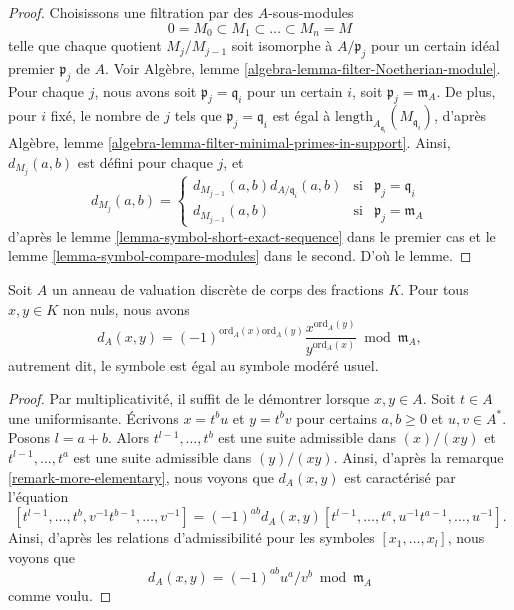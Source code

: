 \begin{proof}
Choisissons une filtration par des $A$-sous-modules
$$
0 = M_0 \subset M_1 \subset \ldots \subset M_n = M
$$
telle que chaque quotient $M_j/M_{j - 1}$ soit isomorphe
à $A/\mathfrak p_j$ pour un certain idéal premier $\mathfrak p_j$
de $A$. Voir Algèbre, lemme \ref{algebra-lemma-filter-Noetherian-module}.
Pour chaque $j$, nous avons soit $\mathfrak p_j = \mathfrak q_i$
pour un certain $i$, soit $\mathfrak p_j = \mathfrak m_A$. De plus,
pour $i$ fixé, le nombre de $j$ tels que
$\mathfrak p_j = \mathfrak q_i$ est égal à
$\text{length}_{A_{\mathfrak q_i}}(M_{\mathfrak q_i})$, d'après
Algèbre, lemme \ref{algebra-lemma-filter-minimal-primes-in-support}.
Ainsi, $d_{M_j}(a, b)$ est défini pour chaque $j$, et
$$
d_{M_j}(a, b)
=
\left\{
\begin{matrix}
d_{M_{j - 1}}(a, b) d_{A/\mathfrak q_i}(a, b) &
\text{si} & \mathfrak p_j = \mathfrak q_i \\
d_{M_{j - 1}}(a, b) & \text{si} & \mathfrak p_j = \mathfrak m_A
\end{matrix}
\right.
$$
d'après le lemme \ref{lemma-symbol-short-exact-sequence} dans le premier cas
et le lemme \ref{lemma-symbol-compare-modules} dans le second. D'où le lemme.
\end{proof}

\begin{lemma}
\label{lemma-symbol-is-usual-tame-symbol}
Soit $A$ un anneau de valuation discrète de corps des fractions $K$.
Pour tous $x, y \in K$ non nuls, nous avons
$$
d_A(x, y)
=
(-1)^{\text{ord}_A(x)\text{ord}_A(y)}
\frac{x^{\text{ord}_A(y)}}{y^{\text{ord}_A(x)}} \bmod \mathfrak m_A,
$$
autrement dit, le symbole est égal au symbole modéré usuel.
\end{lemma}

\begin{proof}
Par multiplicativité, il suffit de le démontrer lorsque $x, y \in A$.
Soit $t \in A$ une uniformisante.
Écrivons $x = t^bu$ et $y = t^bv$ pour certains $a, b \geq 0$
et $u, v \in A^*$. Posons $l = a + b$. Alors
$t^{l - 1}, \ldots, t^b$ est une suite admissible dans
$(x)/(xy)$ et $t^{l - 1}, \ldots, t^a$ est une suite admissible
dans $(y)/(xy)$. Ainsi, d'après la remarque \ref{remark-more-elementary},
nous voyons que $d_A(x, y)$ est caractérisé par l'équation
$$
[t^{l - 1}, \ldots, t^b, v^{-1}t^{b - 1}, \ldots, v^{-1}]
=
(-1)^{ab} d_A(x, y)
[t^{l - 1}, \ldots, t^a, u^{-1}t^{a - 1}, \ldots, u^{-1}].
$$
Ainsi, d'après les relations d'admissibilité pour les
symboles $[x_1, \ldots, x_l]$, nous voyons que
$$
d_A(x, y) = (-1)^{ab} u^a/v^b \bmod \mathfrak m_A
$$
comme voulu.
\end{proof}

